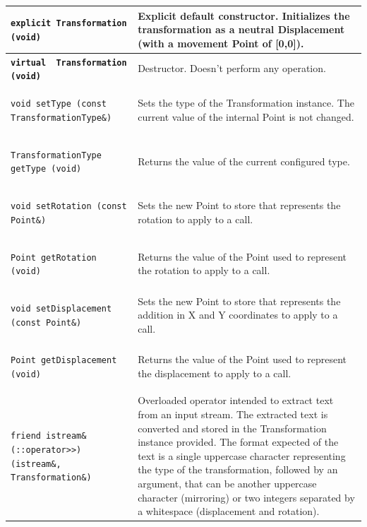 \documentclass[11pt,twoside,openany,x11names,svgnames]{memoir}
\begin{document}
\begin{table}[h]\footnotesize
\centering
\begin{tabular}{| >{\bfseries}p{10cm} | p{5.5cm} |}
	\hline
	
	\texttt{explicit Transformation (void)} & Explicit default constructor. Initializes the transformation as a neutral Displacement (with a movement Point of [0,0]). \\
	
	\hline
	
	\texttt{virtual ~Transformation (void)} & Destructor. Doesn't perform any operation. \\
	
	\hline
	
	\texttt{void setType (const TransformationType\&)} & Sets the type of the Transformation instance. The current value of the internal Point is not changed. \\
	
	\hline	
	
	\texttt{TransformationType getType (void)} & Returns the value of the current configured type. \\
	
	\hline
	
	\texttt{void setRotation (const Point\&)} & Sets the new Point to store that represents the rotation to apply to a call. \\
	
	\hline	
	
	\texttt{Point getRotation (void)} & Returns the value of the Point used to represent the rotation to apply to a call. \\
	
	\hline
	
	\texttt{void setDisplacement (const Point\&)} & Sets the new Point to store that represents the addition in X and Y coordinates to apply to a call. \\
	
	\hline
	
	\texttt{Point getDisplacement (void)} & Returns the value of the Point used to represent the displacement to apply to a call. \\
	
	\hline
	
	\texttt{friend istream\& (::operator>>) (istream\&, Transformation\&)} & Overloaded operator intended to extract text from an input stream. The extracted text is converted and stored in the Transformation instance provided. The format expected of the text is a single uppercase character representing the type of the transformation, followed by an argument, that can be another uppercase character (mirroring) or two integers separated by a whitespace (displacement and rotation). \\
	

\end{tabular}
\end{table}
\end{document}
